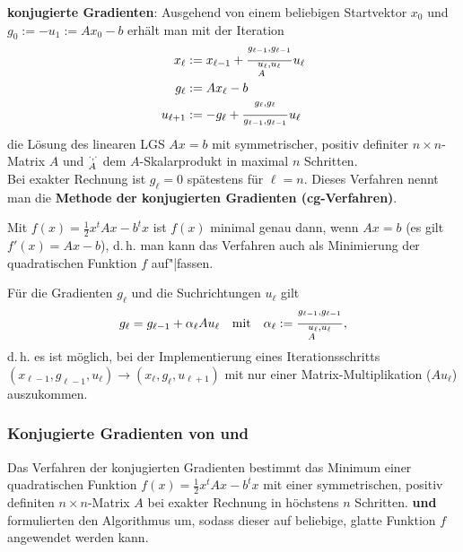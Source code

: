 \linie

\textbf{konjugierte Gradienten}:
Ausgehend von einem beliebigen Startvektor $x_0$ und \\
$g_0 := -u_1 := Ax_0 - b$ erhält man mit der Iteration
\begin{align*}
    x_\ell & := x_{\ell-1} +
    \frac{\sp{g_{\ell-1}, g_{\ell-1}}}{\sp{u_\ell, u_\ell}_A} u_\ell \\
    g_\ell & := Ax_\ell - b \\
    u_{\ell+1} & := -g_\ell +
    \frac{\sp{g_\ell, g_\ell}}{\sp{g_{\ell-1}, g_{\ell-1}}} u_\ell
\end{align*}
die Lösung des linearen LGS $Ax = b$ mit symmetrischer, positiv definiter
$n \times n$-Matrix $A$ und $\sp{\cdot, \cdot}_A$ dem $A$-Skalarprodukt
in maximal $n$ Schritten. \\
Bei exakter Rechnung ist $g_\ell = 0$ spätestens für $\ell = n$.
Dieses Verfahren nennt man die
\textbf{Methode der konjugierten Gradienten (cg-Verfahren)}.

Mit $f(x) = \frac{1}{2} x^t A x - b^t x$ ist $f(x)$ minimal genau dann, wenn
$Ax = b$ (es gilt $f'(x) = Ax - b$), d.\,h. man kann das Verfahren auch
als Minimierung der quadratischen Funktion $f$ auf"|fassen.

Für die Gradienten $g_\ell$ und die Suchrichtungen $u_\ell$ gilt
\begin{align*}
    g_\ell = g_{\ell-1} + \alpha_\ell A u_\ell \quad\text{mit}\quad
    \alpha_\ell := \frac{\sp{g_{\ell-1}, g_{\ell-1}}}{\sp{u_\ell, u_\ell}_A},
\end{align*}
d.\,h. es ist möglich, bei der Implementierung eines Iterationsschritts \\
$(x_{\ell-1}, g_{\ell-1}, u_\ell) \rightarrow (x_\ell, g_\ell, u_{\ell+1})$
mit nur einer Matrix-Multiplikation ($Au_\ell$) auszukommen.

\pagebreak

\subsubsection{%
    Konjugierte Gradienten von  und %
}

Das Verfahren der konjugierten Gradienten bestimmt das Minimum einer
quadratischen Funktion $f(x) = \frac{1}{2} x^t A x - b^t x$ mit einer
symmetrischen, positiv definiten $n \times n$-Matrix $A$ bei exakter Rechnung
in höchstens $n$ Schritten.
\textbf{ und } formulierten den Algorithmus um,
sodass dieser auf beliebige, glatte Funktion $f$ angewendet werden kann.

